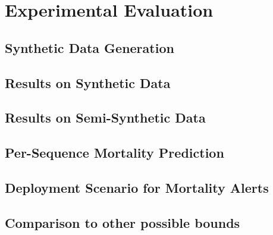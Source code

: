 \section{Experimental Evaluation}

\subsection{Synthetic Data Generation}


\subsection{Results on Synthetic Data}
\label{sec:synth}



\subsection{Results on Semi-Synthetic Data}
\label{sec:semi_synth}



\subsection{Per-Sequence Mortality Prediction}
\label{sec:mimic_mortality_prediction}



\subsection{Deployment Scenario for Mortality Alerts}
\label{sec:mimic_mortality_prediction_deployment}





\subsection{Comparison to other possible bounds}
\label{sec:other_possible_bounds}



